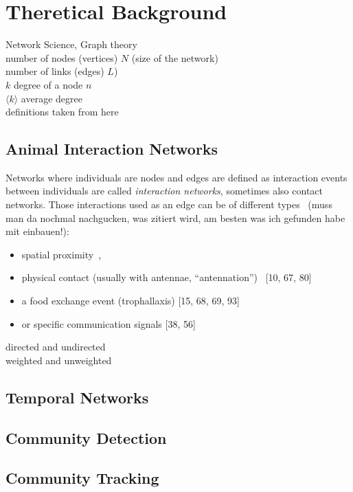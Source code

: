 \chapter{Theretical Background}
Network Science, Graph theory\\
number of nodes (vertices) $N$ (size of the network)\\
number of links (edges) $L$)\\
$k$ degree of a node $n$\\
$ \langle k  \rangle$ average degree\\
definitions taken from here~\cite{barabasi2016network}\\

\section{Animal Interaction Networks}

Networks where individuals are nodes and edges are defined as interaction events between individuals are called \emph{interaction networks}, sometimes also contact networks. 
Those interactions used as an edge can be of different types~\cite{charbonneau2013social} (muss man da nochmal nachgucken, was zitiert wird, am besten was ich gefunden habe mit einbauen!):

\begin{itemize}
\item spatial proximity~\cite{jeanson2012long, otterstatter2007contact},
\item physical contact (usually with antennae, “antennation”)~\cite{mersch2013tracking} [10, 67, 80]
\item a food exchange event (trophallaxis) [15, 68, 69, 93]
\item or specific communication signals [38, 56]
\end{itemize}

directed and undirected\\
weighted and unweighted\\

\section{Temporal Networks}

\section{Community Detection}

\section{Community Tracking}